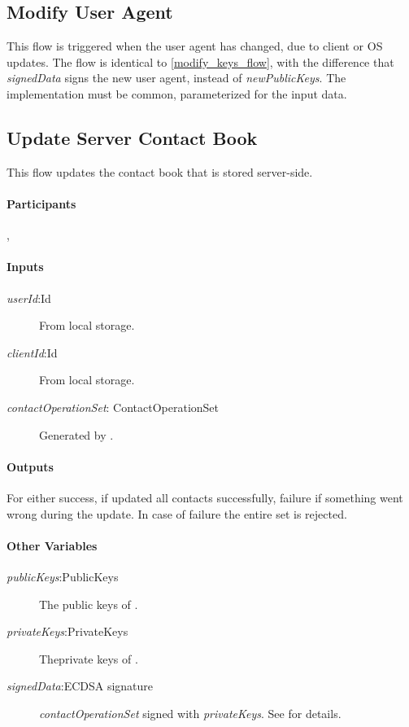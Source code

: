 \documentclass[a4paper,10pt]{article}
\newcommand{\signedData}{\emph{signedData}}
\newcommand{\newPublicKeys}{\emph{newPublicKeys}}
\newcommand{\privateKeys}{\emph{privateKeys}}
\newcommand{\publicKeys}{\emph{publicKeys}}
\newcommand{\userId}{\emph{userId}}
\newcommand{\clientId}{\emph{clientId}}
\newcommand{\contactOperationSet}{\emph{contactOperationSet}}
\begin{document}
\subsection{Modify User Agent}
\label{modify_user_agent_flow}
This flow is triggered when the user agent has changed, due to client or OS updates. The flow is identical to \ref{modify_keys_flow}, with the difference that \signedData{} 
signs the new user agent, instead of \newPublicKeys{}. The implementation must be common, parameterized for the input data.

\subsection{Update Server Contact Book}
This flow updates the contact book that is stored server-side.

\paragraph{Participants} \Client{}, \Server{}

\paragraph{Inputs}
\SpecialItem
\begin{description}
 \item[\userId{}:Id] From \Client{} local storage.
 \item[\clientId{}:Id] From \Client{} local storage.
 \item[\contactOperationSet{}: ContactOperationSet] Generated by \Client{}.
\end{description}

\paragraph{Outputs}
For \Client{} either success, if \Server{} updated all contacts successfully, failure if something went wrong during the update. In case of failure the entire set is rejected.

\paragraph{Other Variables}
\SpecialItem
\begin{description}
 \item[\publicKeys{}:PublicKeys] The public keys of  \Client{}. 
 \item[\privateKeys{}:PrivateKeys] Theprivate keys of \Client{}.
 \item[\signedData{}:ECDSA signature] \contactOperationSet{} signed with
\privateKeys{}. See \cite{crypto_spec} for details.
\end{description}
\end{document}
